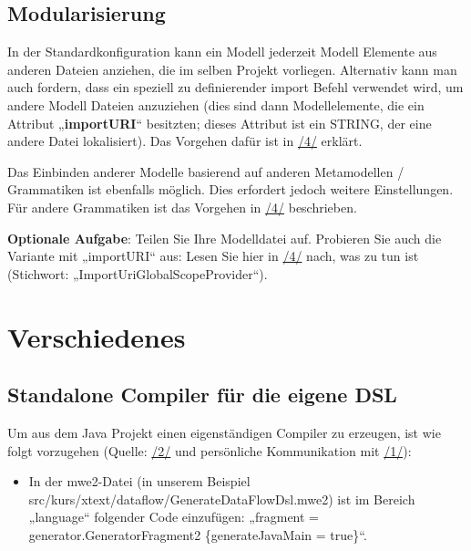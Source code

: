 \documentclass[a4]{article}
\providecommand{\tightlist}{%
  \setlength{\itemsep}{0pt}\setlength{\parskip}{0pt}}
\begin{document}
\subsection[Modularisierung]{\texorpdfstring{\protect\hypertarget{anchor-48}{}{}Modularisierung}{Modularisierung}}\label{modularisierung}

In der Standardkonfiguration kann ein Modell jederzeit Modell Elemente
aus anderen Dateien anziehen, die im selben Projekt vorliegen.
Alternativ kann man auch fordern, dass ein speziell zu definierender
import Befehl verwendet wird, um andere Modell Dateien anzuziehen (dies
sind dann Modellelemente, die ein Attribut „\textbf{importURI}``
besitzten; dieses Attribut ist ein STRING, der eine andere Datei
lokalisiert). Das Vorgehen dafür ist in
\protect\hyperlink{anchor-4}{/4/} erklärt.

Das Einbinden anderer Modelle basierend auf anderen Metamodellen /
Grammatiken ist ebenfalls möglich. Dies erfordert jedoch weitere
Einstellungen. Für andere Grammatiken ist das Vorgehen in
\protect\hyperlink{anchor-4}{/4/} beschrieben.

\textbf{Optionale Aufgabe}: Teilen Sie Ihre Modelldatei auf. Probieren
Sie auch die Variante mit „importURI`` aus: Lesen Sie hier in
\protect\hyperlink{anchor-4}{/4/} nach, was zu tun ist (Stichwort:
„ImportUriGlobalScopeProvider``).

\section[Verschiedenes]{\texorpdfstring{\protect\hypertarget{anchor-49}{}{}Verschiedenes}{Verschiedenes}}\label{verschiedenes-1}

\subsection[Standalone Compiler für die eigene
DSL]{\texorpdfstring{\protect\hypertarget{anchor-50}{}{}Standalone
Compiler für die eigene
DSL}{Standalone Compiler für die eigene DSL}}\label{standalone-compiler-fuxfcr-die-eigene-dsl}

Um aus dem Java Projekt einen eigenständigen Compiler zu erzeugen, ist
wie folgt vorzugehen (Quelle: \protect\hyperlink{anchor-2}{/2/} und
persönliche Kommunikation mit \protect\hyperlink{anchor-1}{/1/}):

\begin{itemize}
\tightlist
\item
  In der mwe2-Datei (in unserem Beispiel
  src/kurs/xtext/dataflow/GenerateDataFlowDsl.mwe2) ist im Bereich
  „language`` folgender Code einzufügen: „fragment =
  generator.GeneratorFragment2 \{generateJavaMain = true\}``.
\end{itemize}
\end{document}
